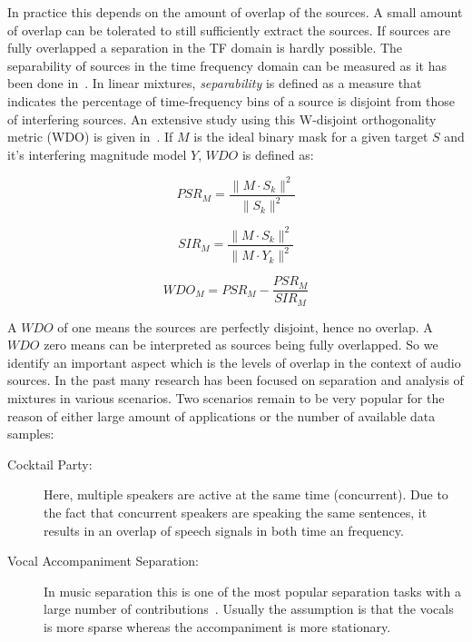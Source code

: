 In practice this depends on the amount of overlap of the sources.
A small amount of overlap can be tolerated to still sufficiently extract the sources.
If sources are fully overlapped a separation in the TF domain is hardly possible.
The separability of sources in the time frequency domain can be measured as it has been done in~\cite{rickard02, giannoulis11}.
In linear mixtures, \emph{separability} is defined as a measure that indicates the percentage of time-frequency bins of a source is disjoint from those of interfering sources.
An extensive study using this W-disjoint orthogonality metric (WDO) is given in~\cite{rickard02}.
If \(M\) is the ideal binary mask for a given target \(S\) and it's interfering
magnitude model \(Y\), \(WDO\) is defined as:

\begin{equation}
    PSR_{M} = \frac{\|M \cdot S_{k}\|^{2}}{\|S_{k}\|^{2}}
\end{equation}

\begin{equation}
    SIR_{M}=\frac{\|M \cdot S_{k}\|^{2}}{\|M \cdot Y_{k}\|^{2}}
\end{equation}

\begin{equation}
    WDO_{M} = PSR_{M} - \frac{PSR_{M}}{SIR_{M}}
\end{equation}


A \(WDO\) of one means the sources are perfectly disjoint, hence no overlap.
A \(WDO\) zero means can be interpreted as sources being fully overlapped.
So we identify an important aspect which is the levels of overlap in the context of audio sources.
In the past many research has been focused on separation and analysis of mixtures in various scenarios.
Two scenarios remain to be very popular for the reason of either large amount of applications or the number of available data samples:

\begin{description}
  \item[Cocktail Party:] Here, multiple speakers are active at the same time (concurrent).
  Due to the fact that concurrent speakers are speaking the same sentences, it results in an overlap of speech signals in both time an frequency.
  \item[Vocal Accompaniment Separation:] In music separation this is one of the most popular separation tasks with a large number of contributions~\cite{rafii18}.
  Usually the assumption is that the vocals is more sparse whereas the accompaniment is more stationary.
\end{description}

